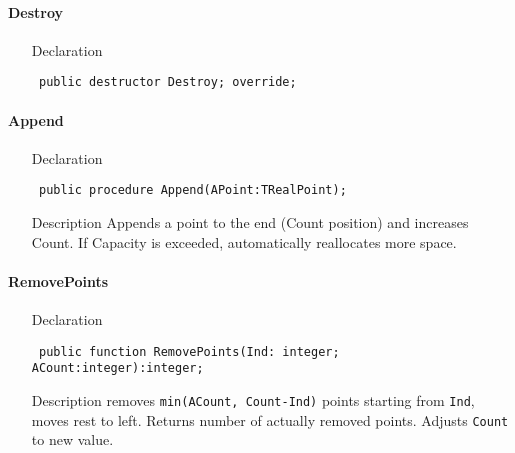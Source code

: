 \documentclass[12pt,a4paper,oneside]{report}
\newcommand{\declarationitem}[1]{{\addfontfeatures{FakeSlant} #1}}
\newcommand{\descriptiontitle}[1]{{\addfontfeatures{FakeSlant}#1}}
\newcommand{\code}[1]{\texttt{#1}}
\begin{document}
\paragraph{Destroy}\hspace*{\fill}

\label{lmPointsVec.TPoints-Destroy}
\begin{itemize}\item[\declarationitem{Declaration}\hfill]
	\begin{flushleft}
		\code{
			public destructor Destroy; override;}
	\end{flushleft}
\end{itemize}
\paragraph{Append}\hspace*{\fill}
\label{lmPointsVec.TPoints-Append}
\begin{itemize}\item[\declarationitem{Declaration}\hfill]
	\begin{flushleft}
		\code{
			public procedure Append(APoint:TRealPoint);}
		
	\end{flushleft}
	
	\par
	\item[\descriptiontitle{Description}]
	Appends a point to the end (Count position) and increases Count. If Capacity is exceeded, automatically reallocates more space.
	
\end{itemize}
\paragraph{RemovePoints}\hspace*{\fill}

\label{lmPointsVec.TPoints-RemovePoints}
\begin{itemize}\item[\declarationitem{Declaration}\hfill]
	\begin{flushleft}
		\code{
			public function RemovePoints(Ind: integer; ACount:integer):integer;}
		
	\end{flushleft}
	
	\par
	\item[\descriptiontitle{Description}]
	removes \code{min(ACount, Count{-}Ind)} points starting from \code{Ind}, moves rest to left. Returns number of actually removed points. Adjusts \code{Count} to new value.
	
\end{itemize}
\end{document}
